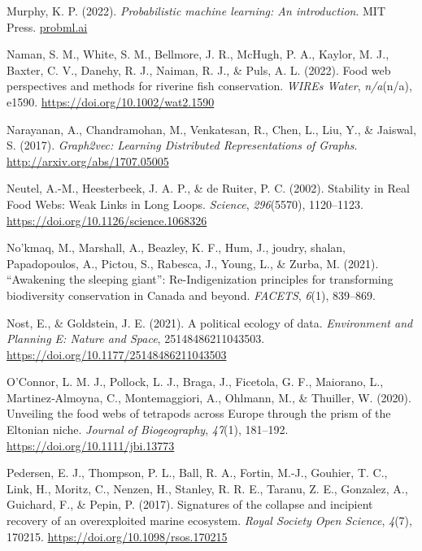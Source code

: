 \documentclass[10pt,oneside]{article}
\newlength{\cslhangindent}
\newenvironment{CSLReferences}[2] %
 {%
  \setlength{\parindent}{0pt}
  \ifodd #1 \everypar{\setlength{\hangindent}{\cslhangindent}}\ignorespaces\fi
  \ifnum #2 > 0
  \setlength{\parskip}{#2\baselineskip}
  \fi
 }%
 {}
\begin{document}
\begin{CSLReferences}{1}{0}
\leavevmode{}%
Murphy, K. P. (2022). \emph{Probabilistic machine learning: An
introduction}. MIT Press. \href{https://probml.ai}{probml.ai}

\leavevmode{}%
Naman, S. M., White, S. M., Bellmore, J. R., McHugh, P. A., Kaylor, M.
J., Baxter, C. V., Danehy, R. J., Naiman, R. J., \& Puls, A. L. (2022).
Food web perspectives and methods for riverine fish conservation.
\emph{WIREs Water}, \emph{n/a}(n/a), e1590.
\url{https://doi.org/10.1002/wat2.1590}

\leavevmode{}%
Narayanan, A., Chandramohan, M., Venkatesan, R., Chen, L., Liu, Y., \&
Jaiswal, S. (2017). \emph{Graph2vec: Learning Distributed
Representations of Graphs}. \url{http://arxiv.org/abs/1707.05005}

\leavevmode{}%
Neutel, A.-M., Heesterbeek, J. A. P., \& de Ruiter, P. C. (2002).
Stability in Real Food Webs: Weak Links in Long Loops. \emph{Science},
\emph{296}(5570), 1120--1123.
\url{https://doi.org/10.1126/science.1068326}

\leavevmode{}%
No'kmaq, M., Marshall, A., Beazley, K. F., Hum, J., joudry, shalan,
Papadopoulos, A., Pictou, S., Rabesca, J., Young, L., \& Zurba, M.
(2021). {``Awakening the sleeping giant''}: Re-Indigenization principles
for transforming biodiversity conservation in Canada and beyond.
\emph{FACETS}, \emph{6}(1), 839--869.

\leavevmode{}%
Nost, E., \& Goldstein, J. E. (2021). A political ecology of data.
\emph{Environment and Planning E: Nature and Space}, 25148486211043503.
\url{https://doi.org/10.1177/25148486211043503}

\leavevmode{}%
O'Connor, L. M. J., Pollock, L. J., Braga, J., Ficetola, G. F.,
Maiorano, L., Martinez‐Almoyna, C., Montemaggiori, A., Ohlmann, M., \&
Thuiller, W. (2020). Unveiling the food webs of tetrapods across Europe
through the prism of the Eltonian niche. \emph{Journal of Biogeography},
\emph{47}(1), 181--192. \url{https://doi.org/10.1111/jbi.13773}

\leavevmode{}%
Pedersen, E. J., Thompson, P. L., Ball, R. A., Fortin, M.-J., Gouhier,
T. C., Link, H., Moritz, C., Nenzen, H., Stanley, R. R. E., Taranu, Z.
E., Gonzalez, A., Guichard, F., \& Pepin, P. (2017). Signatures of the
collapse and incipient recovery of an overexploited marine ecosystem.
\emph{Royal Society Open Science}, \emph{4}(7), 170215.
\url{https://doi.org/10.1098/rsos.170215}


\end{CSLReferences}
\end{document}
